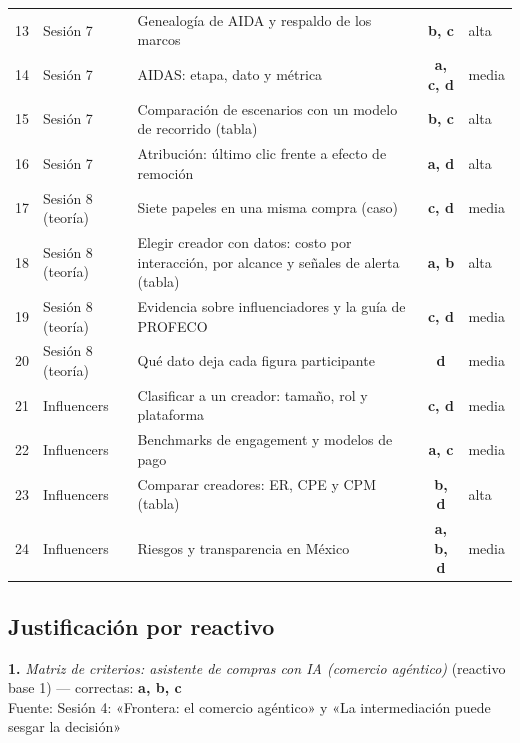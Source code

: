 \documentclass[10pt,letterpaper]{article}
\begin{document}
\begin{center}
\begin{tabular}{@{}rllcl@{}}
13 & Sesión 7 & Genealogía de AIDA y respaldo de los marcos & \textbf{b, c} & alta\\
14 & Sesión 7 & AIDAS: etapa, dato y métrica & \textbf{a, c, d} & media\\
15 & Sesión 7 & Comparación de escenarios con un modelo de recorrido (tabla) & \textbf{b, c} & alta\\
16 & Sesión 7 & Atribución: último clic frente a efecto de remoción & \textbf{a, d} & alta\\
17 & Sesión 8 (teoría) & Siete papeles en una misma compra (caso) & \textbf{c, d} & media\\
18 & Sesión 8 (teoría) & Elegir creador con datos: costo por interacción, por alcance y señales de alerta (tabla) & \textbf{a, b} & alta\\
19 & Sesión 8 (teoría) & Evidencia sobre influenciadores y la guía de PROFECO & \textbf{c, d} & media\\
20 & Sesión 8 (teoría) & Qué dato deja cada figura participante & \textbf{d} & media\\
21 & Influencers & Clasificar a un creador: tamaño, rol y plataforma & \textbf{c, d} & media\\
22 & Influencers & Benchmarks de engagement y modelos de pago & \textbf{a, c} & media\\
23 & Influencers & Comparar creadores: ER, CPE y CPM (tabla) & \textbf{b, d} & alta\\
24 & Influencers & Riesgos y transparencia en México & \textbf{a, b, d} & media\\
\bottomrule\end{tabular}\end{center}\subsection*{Justificación por reactivo}
\vspace{3pt}\noindent\textbf{1.} \textit{Matriz de criterios: asistente de compras con IA (comercio agéntico)} (reactivo base 1) — correctas: \textbf{a, b, c}\\[-1pt]
{\scriptsize Fuente: Sesión 4: «Frontera: el comercio agéntico» y «La intermediación puede sesgar la decisión»}
\end{document}
